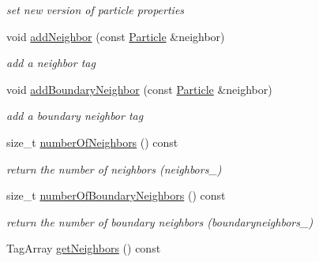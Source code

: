 \begin{DoxyCompactItemize}
\begin{DoxyCompactList}\small\item\em set new version of particle properties \end{DoxyCompactList}\item 
\hypertarget{classParticle_a3ac6511d98e8472de59bb474dfe851a1}{void \hyperlink{classParticle_a3ac6511d98e8472de59bb474dfe851a1}{add\-Neighbor} (const \hyperlink{classParticle}{\-Particle} \&neighbor)}\label{classParticle_a3ac6511d98e8472de59bb474dfe851a1}

\begin{DoxyCompactList}\small\item\em add a neighbor tag \end{DoxyCompactList}\item 
\hypertarget{classParticle_a19bc575957444c91ed5c236e065673ac}{void \hyperlink{classParticle_a19bc575957444c91ed5c236e065673ac}{add\-Boundary\-Neighbor} (const \hyperlink{classParticle}{\-Particle} \&neighbor)}\label{classParticle_a19bc575957444c91ed5c236e065673ac}

\begin{DoxyCompactList}\small\item\em add a boundary neighbor tag \end{DoxyCompactList}\item 
\hypertarget{classParticle_addaece13cd072de3db9b3281262a9793}{size\-\_\-t \hyperlink{classParticle_addaece13cd072de3db9b3281262a9793}{number\-Of\-Neighbors} () const }\label{classParticle_addaece13cd072de3db9b3281262a9793}

\begin{DoxyCompactList}\small\item\em return the number of neighbors (neighbors\-\_\-) \end{DoxyCompactList}\item 
\hypertarget{classParticle_a73a8242d6ee30d116ca6bdf952bd7b89}{size\-\_\-t \hyperlink{classParticle_a73a8242d6ee30d116ca6bdf952bd7b89}{number\-Of\-Boundary\-Neighbors} () const }\label{classParticle_a73a8242d6ee30d116ca6bdf952bd7b89}

\begin{DoxyCompactList}\small\item\em return the number of boundary neighbors (boundaryneighbors\-\_\-) \end{DoxyCompactList}\item 
\hypertarget{classParticle_ae3e4f71b6d03c5e100674e8dead0565e}{\-Tag\-Array \hyperlink{classParticle_ae3e4f71b6d03c5e100674e8dead0565e}{get\-Neighbors} () const }\label{classParticle_ae3e4f71b6d03c5e100674e8dead0565e}


\end{DoxyCompactItemize}
